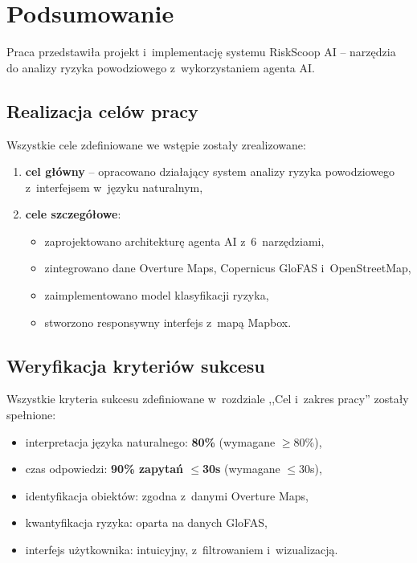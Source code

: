 \section*{Podsumowanie}

Praca przedstawiła projekt i~implementację systemu RiskScoop AI -- narzędzia do analizy ryzyka powodziowego z~wykorzystaniem agenta AI.

\subsection*{Realizacja celów pracy}

Wszystkie cele zdefiniowane we wstępie zostały zrealizowane:

\begin{enumerate}
    \item \textbf{cel główny} -- opracowano działający system analizy ryzyka powodziowego z~interfejsem w~języku naturalnym,

    \item \textbf{cele szczegółowe}:
    \begin{itemize}
        \item zaprojektowano architekturę agenta AI z~6~narzędziami,
        \item zintegrowano dane Overture Maps, Copernicus GloFAS i~OpenStreetMap,
        \item zaimplementowano model klasyfikacji ryzyka,
        \item stworzono responsywny interfejs z~mapą Mapbox.
    \end{itemize}
\end{enumerate}

\subsection*{Weryfikacja kryteriów sukcesu}

Wszystkie kryteria sukcesu zdefiniowane w~rozdziale ,,Cel i~zakres pracy'' zostały spełnione:

\begin{itemize}
    \item interpretacja języka naturalnego: \textbf{80\%} (wymagane $\geq$80\%),
    \item czas odpowiedzi: \textbf{90\% zapytań $\leq$30s} (wymagane $\leq$30s),
    \item identyfikacja obiektów: zgodna z~danymi Overture Maps,
    \item kwantyfikacja ryzyka: oparta na danych GloFAS,
    \item interfejs użytkownika: intuicyjny, z~filtrowaniem i~wizualizacją.
\end{itemize}

